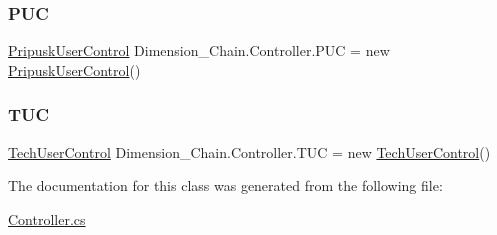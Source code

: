 \mbox{\label{class_dimension___chain_1_1_controller_a04aadf04988418c18ea1f1bb1f0fd59a}} 
\subsubsection{\texorpdfstring{P\+UC}{PUC}}
{\footnotesize\ttfamily \mbox{\hyperlink{class_dimension___chain_1_1_pripusk_user_control}{Pripusk\+User\+Control}} Dimension\+\_\+\+Chain.\+Controller.\+P\+UC = new \mbox{\hyperlink{class_dimension___chain_1_1_pripusk_user_control}{Pripusk\+User\+Control}}()\hspace{0.3cm}{\ttfamily [static]}}

\mbox{\label{class_dimension___chain_1_1_controller_a1547436a62102acbfce6b42eaabe4218}} 
\subsubsection{\texorpdfstring{T\+UC}{TUC}}
{\footnotesize\ttfamily \mbox{\hyperlink{class_dimension___chain_1_1_tech_user_control}{Tech\+User\+Control}} Dimension\+\_\+\+Chain.\+Controller.\+T\+UC = new \mbox{\hyperlink{class_dimension___chain_1_1_tech_user_control}{Tech\+User\+Control}}()\hspace{0.3cm}{\ttfamily [static]}}



The documentation for this class was generated from the following file\+:\begin{DoxyCompactItemize}
\item 
\mbox{\hyperlink{_controller_8cs}{Controller.\+cs}}\end{DoxyCompactItemize}
